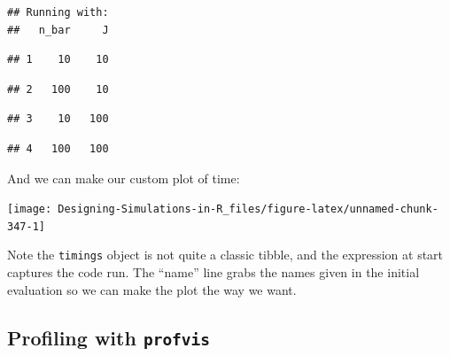 \documentclass[
]{book}
\newenvironment{Shaded}{\begin{snugshade}}{\end{snugshade}}
\newcommand{\AttributeTok}[1]{\textcolor[rgb]{0.13,0.29,0.53}{#1}}
\newcommand{\FunctionTok}[1]{\textcolor[rgb]{0.13,0.29,0.53}{\textbf{#1}}}
\newcommand{\NormalTok}[1]{#1}
\newcommand{\OtherTok}[1]{\textcolor[rgb]{0.56,0.35,0.01}{#1}}
\newcommand{\SpecialCharTok}[1]{\textcolor[rgb]{0.81,0.36,0.00}{\textbf{#1}}}
\newcommand{\StringTok}[1]{\textcolor[rgb]{0.31,0.60,0.02}{#1}}
\begin{document}
\begin{verbatim}
## Running with:
##   n_bar     J
\end{verbatim}

\begin{verbatim}
## 1    10    10
\end{verbatim}

\begin{verbatim}
## 2   100    10
\end{verbatim}

\begin{verbatim}
## 3    10   100
\end{verbatim}

\begin{verbatim}
## 4   100   100
\end{verbatim}

And we can make our custom plot of time:

\begin{Shaded}
\end{Shaded}

\begin{center}\texttt{[image: Designing-Simulations-in-R\_files/figure-latex/unnamed-chunk-347-1]} \end{center}

Note the \texttt{timings} object is not quite a classic tibble, and the expression at start captures the code run. The ``name'' line grabs the names given in the initial evaluation so we can make the plot the way we want.

\subsection{\texorpdfstring{Profiling with \texttt{profvis}}{Profiling with profvis}}\label{profiling-with-profvis}
\end{document}
